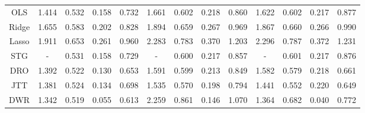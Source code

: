 \begin{table*}[!ht]
{\begin{tabular}{@{}ccccccccccccc@{}}
\multicolumn{1}{c|}{OLS}       & 1.414                & 0.532                & 0.158                & \multicolumn{1}{c|}{0.732}                & 1.661                & 0.602                & 0.218                & \multicolumn{1}{c|}{0.860}                & 1.622                & 0.602                & 0.217                & 0.877                \\
\multicolumn{1}{c|}{Ridge}     & 1.655                & 0.583                & 0.202                & \multicolumn{1}{c|}{0.828}                & 1.894                & 0.659                & 0.267                & \multicolumn{1}{c|}{0.969}                & 1.867                & 0.660                & 0.266                & 0.990                \\
\multicolumn{1}{c|}{Lasso}     & 1.911                & 0.653                & 0.261                & \multicolumn{1}{c|}{0.960}                & 2.283                & 0.783                & 0.370                & \multicolumn{1}{c|}{1.203}                & 2.296                & 0.787                & 0.372                & 1.231                \\
\multicolumn{1}{c|}{STG}       & -                    & 0.531                & 0.158                & \multicolumn{1}{c|}{0.729}                & -                    & 0.600                & 0.217                & \multicolumn{1}{c|}{0.857}                & -                    & 0.601                & 0.217                & 0.876                \\
\multicolumn{1}{c|}{DRO}       & 1.392                & 0.522                & 0.130                & \multicolumn{1}{c|}{0.653}                & 1.591                & 0.599                & 0.213                & \multicolumn{1}{c|}{0.849}                & 1.582                & 0.579                & 0.218                & 0.661                \\
\multicolumn{1}{c|}{JTT}       & 1.381                & 0.524                & 0.134                & \multicolumn{1}{c|}{0.698}                & 1.535                & 0.570                & 0.198                & \multicolumn{1}{c|}{0.794}                & 1.441                & 0.552                & 0.220                & 0.649                \\ \midrule
\multicolumn{1}{c|}{DWR}       & 1.342                & 0.519                & 0.055                & \multicolumn{1}{c|}{0.613}                & 2.259                & 0.861                & 0.146                & \multicolumn{1}{c|}{1.070}                & 1.364                & 0.682                & 0.040                & 0.772                \\

\end{tabular}}
\end{table*}
